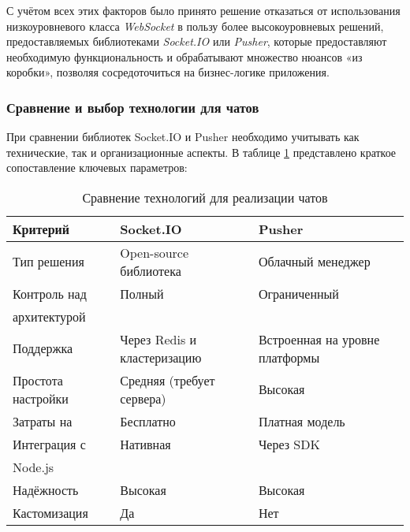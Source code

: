 С учётом всех этих факторов было принято решение отказаться от использования низкоуровневого класса \textit{WebSocket} в пользу более высокоуровневых решений, предоставляемых библиотеками \textit{Socket.IO} или \textit{Pusher}, которые предоставляют необходимую функциональность и обрабатывают множество нюансов «из коробки», позволяя сосредоточиться на бизнес-логике приложения.


\subsubsection*{Сравнение и выбор технологии для чатов}

При сравнении библиотек Socket.IO и Pusher необходимо учитывать как технические, так и организационные аспекты. В таблице \ref{tab:chat-comparison} представлено краткое сопоставление ключевых параметров:

\begin{table}[h]
  \centering
  \caption{Сравнение технологий для реализации чатов}
  \small
  \label{tab:chat-comparison}
  \begin{tabular}{|l|p{5cm}|p{5cm}|}
  	\hline
  	\textbf{Критерий}  & \textbf{Socket.IO}          & \textbf{Pusher}                \\ \hline
  	Тип решения        & Open-source библиотека      & Облачный менеджер              \\ \hline
  	Контроль над       & Полный                      & Ограниченный                   \\
  	архитектурой       &                             &                                \\ \hline
  	Поддержка          & Через Redis и кластеризацию & Встроенная на уровне платформы \\ \hline
  	Простота настройки & Средняя (требует сервера)   & Высокая                        \\ \hline
  	Затраты на         & Бесплатно                   & Платная модель                 \\ \hline
  	Интеграция с       & Нативная                    & Через SDK                      \\
  	Node.js            &                             &                                \\ \hline
  	Надёжность         & Высокая                     & Высокая                        \\ \hline
  	Кастомизация       & Да                          & Нет                            \\ \hline
  \end{tabular}
\end{table}


